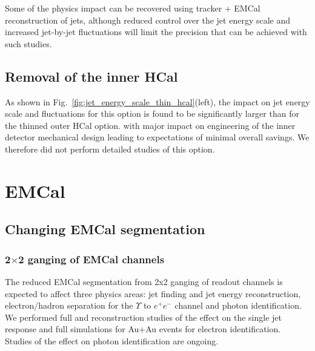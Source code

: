 Some of the physics impact can be recovered using tracker + EMCal reconstruction of jets, although reduced control over the jet 
energy scale and increased jet-by-jet fluctuations will limit the precision that can be achieved with such studies.

\subsection{Removal of the inner HCal}

As shown in Fig.~\ref{fig:jet_energy_scale_thin_hcal}(left), the impact on jet energy scale and fluctuations for this option is 
found to be significantly larger than for the thinned outer HCal option. 
with major impact on engineering of the inner detector mechanical design leading to expectations of minimal overall savings.
We therefore did not perform detailed studies of this option.

\section{EMCal}
\subsection{Changing EMCal segmentation}
\subsubsection{2$\times$2 ganging of EMCal channels}
The reduced EMCal segmentation from 2x2 ganging of readout channels is expected to affect three physics areas: jet finding 
and jet energy reconstruction, electron/hadron separation for the $\Upsilon$ to $e^+ e^-$ channel and photon identification.
We performed full \geant and reconstruction studies of the effect on the single jet response and full \geant simulations for 
Au+Au \hijing events for electron identification. Studies of the effect on photon identification are ongoing.


